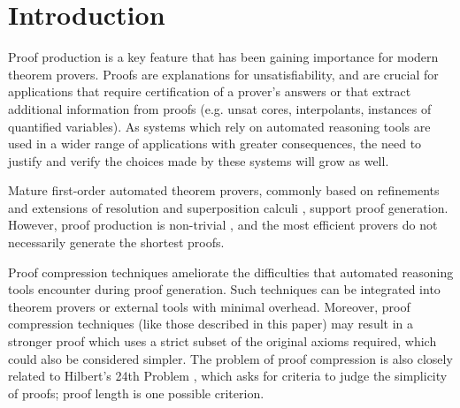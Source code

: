 \section{Introduction} 


Proof production is a key feature that has been gaining importance for modern theorem provers. 
Proofs are explanations for unsatisfiability, and are  crucial for applications that require certification of a prover's answers or that extract additional information from proofs (e.g. unsat cores, interpolants, instances of quantified variables). 
As systems which rely on automated reasoning tools are used in a wider range of applications with greater consequences, the need to justify and verify the choices made by these systems will grow as well. 

Mature first-order automated theorem provers, commonly based on refinements and extensions of resolution and superposition calculi \cite{Vampire,EProver,Spass,spassT,prover9-mace4}, support proof generation. However, proof production is non-trivial \cite{SchulzAPPA}, and the most efficient provers do not necessarily generate the shortest proofs. 

Proof compression techniques ameliorate the difficulties that automated reasoning tools encounter during proof generation. Such techniques can be integrated into theorem provers or external tools with minimal overhead. Moreover, proof compression techniques (like those described in this paper) may result in a stronger proof which uses a strict subset of the original axioms required, which could also be considered simpler. The problem of proof compression is also closely related to Hilbert's 24th Problem \cite{Hilbert24Problem}, which asks for criteria to judge the simplicity of proofs; proof length is one possible criterion. 



